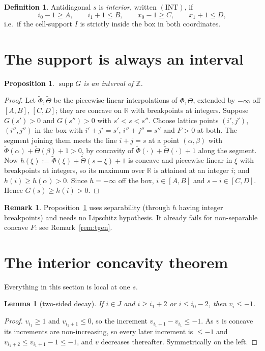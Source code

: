 \documentclass[11pt]{article}
\newtheorem{proposition}[theorem]{Proposition}
\newtheorem{lemma}[theorem]{Lemma}
\theoremstyle{definition}
\newtheorem{definition}[theorem]{Definition}
\newtheorem{remark}[theorem]{Remark}
\DeclareMathOperator{\supp}{supp}
\newcommand{\Z}{\mathbb{Z}}
\newcommand{\INT}{(\mathrm{INT})}
\begin{document}
\begin{definition}\label{def:int}
Antidiagonal $s$ is \emph{interior}, written $\INT$, if
\[
  i_0-1\ge A,\qquad i_1+1\le B,\qquad x_0-1\ge C,\qquad x_1+1\le D,
\]
i.e.\ if the cell-support $I$ is strictly inside the box in both coordinates.
\end{definition}

\section{The support is always an interval}

\begin{proposition}\label{prop:supp}
$\supp G$ is an interval of $\Z$.
\end{proposition}

\begin{proof}
Let $\widetilde\Phi,\widetilde\Theta$ be the piecewise-linear interpolations of
$\Phi,\Theta$, extended by $-\infty$ off $[A,B]$, $[C,D]$; they are concave on $\mathbb R$
with breakpoints at integers. Suppose $G(s')>0$ and $G(s'')>0$ with $s'<s<s''$. Choose
lattice points $(i',j')$, $(i'',j'')$ in the box with $i'+j'=s'$, $i''+j''=s''$ and
$F>0$ at both. The segment joining them meets the line $i+j=s$ at a point $(\alpha,\beta)$
with $\widetilde\Phi(\alpha)+\widetilde\Theta(\beta)+1>0$, by concavity of
$\widetilde\Phi(\cdot)+\widetilde\Theta(\cdot)+1$ along the segment. Now
$h(\xi):=\widetilde\Phi(\xi)+\widetilde\Theta(s-\xi)+1$ is concave and piecewise linear
in $\xi$ with breakpoints at integers, so its maximum over $\mathbb R$ is attained at an
integer $i$; and $h(i)\ge h(\alpha)>0$. Since $h=-\infty$ off the box, $i\in[A,B]$ and
$s-i\in[C,D]$. Hence $G(s)\ge h(i)>0$.
\end{proof}

\begin{remark}
Proposition~\ref{prop:supp} uses separability (through $h$ having integer breakpoints)
and needs no Lipschitz hypothesis. It already fails for non-separable concave $F$: see
Remark~\ref{rem:tgen}.
\end{remark}

\section{The interior concavity theorem}

Everything in this section is local at one $s$.

\begin{lemma}[two-sided decay]\label{lem:decay}
If $i\in J$ and $i\ge i_1+2$ or $i\le i_0-2$, then $v_i\le -1$.
\end{lemma}
\begin{proof}
$v_{i_1}\ge1$ and $v_{i_1+1}\le0$, so the increment $v_{i_1+1}-v_{i_1}\le-1$. As $v$ is
concave its increments are non-increasing, so every later increment is $\le-1$ and
$v_{i_1+2}\le v_{i_1+1}-1\le-1$, and $v$ decreases thereafter. Symmetrically on the left.
\end{proof}
\end{document}
